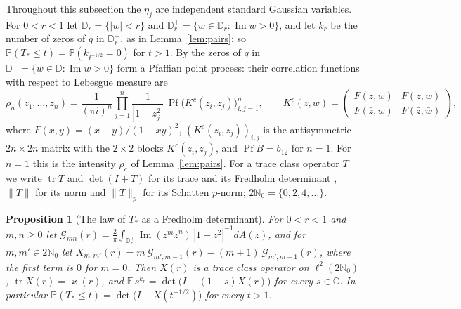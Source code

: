 \documentclass[11pt]{amsart}
\newtheorem{proposition}[theorem]{Proposition}
\theoremstyle{definition}
\theoremstyle{remark}
\numberwithin{equation}{section}
\newcommand{\C}{\mathbb{C}}
\newcommand{\N}{\mathbb{N}}
\newcommand{\D}{\mathbb{D}}
\newcommand{\E}{\mathbb{E}}
\newcommand{\PP}{\mathbb{P}}
\DeclareMathOperator{\im}{Im}
\begin{document}
Throughout this subsection the $\eta_j$ are independent standard Gaussian variables. For $0<r<1$ let $\D_r=\{|w|<r\}$ and $\D_r^+=\{w\in\D_r:\im w>0\}$, and let $k_r$ be the number of zeros of $q$ in $\D_r^+$, as in Lemma~\ref{lem:pairs}; so $\PP(T_*\le t)=\PP(k_{t^{-1/2}}=0)$ for $t>1$. By \cite[Theorem~2.7]{MS} the zeros of $q$ in $\D^+=\{w\in\D:\im w>0\}$ form a Pfaffian point process: their correlation functions with respect to Lebesgue measure are
\begin{equation}\label{eq:ms-kernel}
\rho_n(z_1,\dots,z_n)=\frac1{(\pi i)^n}\prod_{j=1}^n\frac1{|1-z_j^2|}\,\operatorname{Pf}\bigl(K^c(z_i,z_j)\bigr)_{i,j=1}^n,\qquad
K^c(z,w)=\begin{pmatrix}F(z,w)&F(z,\bar w)\\F(\bar z,w)&F(\bar z,\bar w)\end{pmatrix},
\end{equation}
where $F(x,y)=(x-y)/(1-xy)^2$, $(K^c(z_i,z_j))_{i,j}$ is the antisymmetric $2n\times2n$ matrix with the $2\times2$ blocks $K^c(z_i,z_j)$, and $\operatorname{Pf}B=b_{12}$ for $n=1$. For $n=1$ this is the intensity $\rho_c$ of Lemma~\ref{lem:pairs}. For a trace class operator $T$ we write $\operatorname{tr}T$ and $\det(I+T)$ for its trace and its Fredholm determinant \cite[Section~14.5]{vN}, $\|T\|$ for its norm and $\|T\|_p$ for its Schatten $p$-norm; $2\N_0=\{0,2,4,\dots\}$.

\begin{proposition}[The law of $T_*$ as a Fredholm determinant]\label{prop:fredholm}
For $0<r<1$ and $m,n\ge0$ let $\mathcal G_{mn}(r)=\frac2\pi\int_{\D_r^+}\im(z^m\bar z^n)\,|1-z^2|^{-1}dA(z)$, and for $m,m'\in2\N_0$ let $X_{m,m'}(r)=m\,\mathcal G_{m',m-1}(r)-(m+1)\,\mathcal G_{m',m+1}(r)$, where the first term is $0$ for $m=0$. Then $X(r)$ is a trace class operator on $\ell^2(2\N_0)$, $\operatorname{tr}X(r)=\varkappa(r)$, and $\E\,s^{k_r}=\det\bigl(I-(1-s)X(r)\bigr)$ for every $s\in\C$. In particular $\PP(T_*\le t)=\det\bigl(I-X(t^{-1/2})\bigr)$ for every $t>1$.
\end{proposition}
\end{document}
